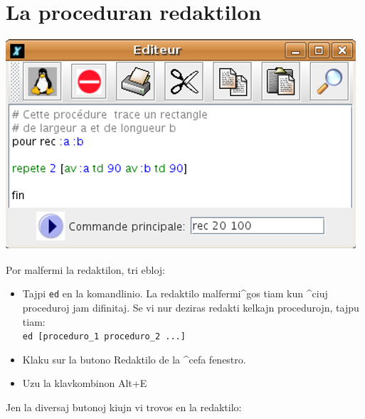 \section{La proceduran redaktilon}
\begin{center}
 \includegraphics[scale=0.4]{bildoj/CaptureEditeur.png}
\end{center}
Por malfermi la redaktilon, tri ebloj:
\begin{itemize}
\item Tajpi \texttt{ed} en la komandlinio.  La redaktilo malfermi^gos
  tiam kun ^ciuj proceduroj jam difinitaj.  Se vi nur deziras redakti
  kelkajn procedurojn, tajpu tiam:\\
  \texttt{ed [proceduro\_1 proceduro\_2 ...]}
\item Klaku sur la butono Redaktilo de la ^cefa fenestro.
\item Uzu la klavkombinon Alt+E
\end{itemize} 
\vspace{0.5cm}
Jen la diversaj butonoj kiujn vi trovos en la redaktilo:\\

